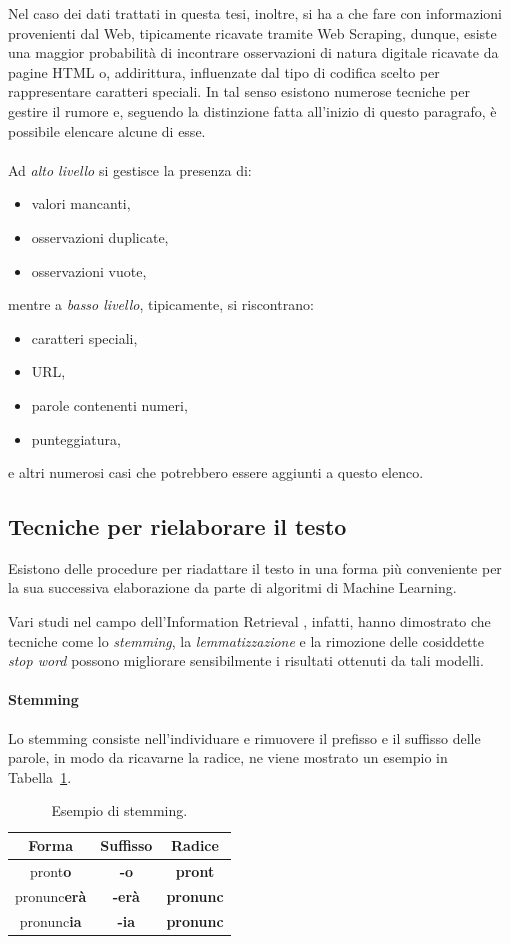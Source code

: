 \documentclass[12pt]{report}
\theoremstyle{definition}
\begin{document}
Nel caso dei dati trattati in questa tesi, inoltre, si ha a che fare con informazioni provenienti dal Web, tipicamente ricavate tramite Web Scraping, dunque, esiste una maggior probabilità di incontrare osservazioni di natura digitale ricavate da pagine HTML o, addirittura, influenzate dal tipo di codifica scelto per rappresentare caratteri speciali.
In tal senso esistono numerose tecniche per gestire il rumore e, seguendo la distinzione fatta all'inizio di questo paragrafo, è possibile elencare alcune di esse.
\\
\\
Ad \textit{alto livello} si gestisce la presenza di:
\begin{itemize}
    \item valori mancanti,
    \item osservazioni duplicate,
    \item osservazioni vuote,
\end{itemize}

mentre a \textit{basso livello}, tipicamente, si riscontrano:
\begin{itemize}
    \item caratteri speciali,
    \item URL,
    \item parole contenenti numeri,
    \item punteggiatura,
\end{itemize}

e altri numerosi casi che potrebbero essere aggiunti a questo elenco.
\subsection{Tecniche per rielaborare il testo}
Esistono delle procedure per riadattare il testo in una forma più conveniente per la sua successiva elaborazione da parte di algoritmi di Machine Learning.

Vari studi nel campo dell'Information Retrieval \cite{2, 22}, infatti, hanno dimostrato che tecniche come lo \textit{stemming}, la \textit{lemmatizzazione} e la rimozione delle cosiddette \textit{stop word} possono migliorare sensibilmente i risultati ottenuti da tali modelli.

\paragraph{Stemming} Lo stemming consiste nell'individuare e rimuovere il prefisso e il suffisso delle parole, in modo da ricavarne la radice, ne viene mostrato un esempio in Tabella~\ref{stemming}.
\begin{table}
\centering
 \begin{tabular}{|c|c|c|} 
 \hline 
 \textbf{Forma} & \textbf{Suffisso} & \textbf{Radice}
\\ [0.5ex] 
\hline
pront\textbf{o} & \textbf{-o} & \textbf{pront} \\
pronunc\textbf{erà} & \textbf{-erà} & \textbf{pronunc} \\
pronunc\textbf{ia} & \textbf{-ia} & \textbf{pronunc} \\
 \hline
\end{tabular}
\caption{Esempio di stemming.}
\label{stemming}
\end{table}
\end{document}
